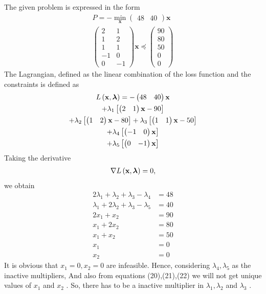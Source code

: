 \documentclass[journal,12pt,twocolumn]{IEEEtran}
\newcommand{\myvec}[1]{\ensuremath{\begin{pmatrix}#1\end{pmatrix}}}
\let\vec\mathbf
\begin{document}
\begin{enumerate}
        The given problem is expressed in the form 
        \begin{align}
	        P = -\min_{\vec{x}}\myvec{48 & 40}\vec{x} \\
	        \myvec{2 & 1 \\ 1 & 2 \\ 1 & 1 \\ -1 & 0 \\ 0 & -1} \vec{x}\preceq \myvec{90 \\ 80 \\50 \\ 0 \\0}
        \end{align}
        The Lagrangian, defined as the linear combination of the loss function and the constraints is defined as
        \begin{multline}
	        L\brak{\vec{x},\bm{\lambda}} =-\myvec{48 & 40}\vec{x} \\
	        + \lambda_1\sbrak{\myvec{2 & 1}\vec{x}-90} \\
    	    + \lambda_2\sbrak{\myvec{1 & 2}\vec{x}-80}
    	    + \lambda_3\sbrak{\myvec{1 & 1}\vec{x}-50} \\
            + \lambda_4\sbrak{\myvec{-1 & 0}\vec{x}} \\
            + \lambda_5\sbrak{\myvec{0 & -1}\vec{x}}
        \end{multline}
        Taking the derivative
        \begin{align}
	        {\nabla L\brak{\vec{x},\bm{\lambda}}} = 0,
        \end{align}
        we obtain 
        \begin{align}
        	2\lambda_1 + \lambda_2 + \lambda_3 - \lambda_4 &= 48 \\
        	\lambda_1 + 2\lambda_2 + \lambda_3 - \lambda_5 &= 40 \\
        	2x_1 + x_2 &= 90 \\
        	x_1 + 2x_2 &= 80 \\
        	x_1 + x_2 &= 50 \\
        	x_1 &= 0 \\
        	x_2 &= 0
        \end{align}
        It is obvious that $x_1=0, x_2=0$ are infeasible.  Hence, considering $\lambda_4, \lambda_5$ as the inactive multipliers, And also from equations (20),(21),(22) we will not get unique values of $x_1$ and $x_2$ . So, there has to be a inactive multiplier in  $\lambda_1, \lambda_2$ and $\lambda_3$ .


\end{enumerate}
\end{document}
